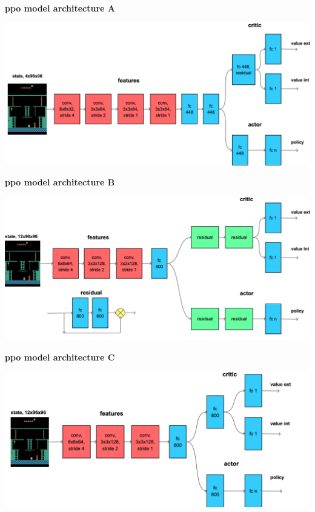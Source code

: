 \documentclass[xcolor=dvipsnames]{beamer}
\begin{document}
\begin{frame}{\bf ppo model architecture A}

\centering
\includegraphics[scale=0.12]{../diagrams/rnd/modelppoa.png}

\end{frame}

\begin{frame}{\bf ppo model architecture B}

\centering
\includegraphics[scale=0.1]{../diagrams/rnd/modelppob.png}

\end{frame}


\begin{frame}{\bf ppo model architecture C}

\centering
\includegraphics[scale=0.12]{../diagrams/rnd/modelppoc.png}

\end{frame}
\end{document}
